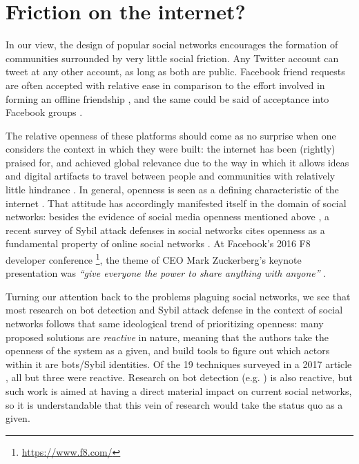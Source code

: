 \documentclass[sigconf,authordraft]{acmart}
\begin{document}
\section{Friction on the internet?}

In our view, the design of popular social networks encourages the formation of communities surrounded by very little social friction. Any Twitter account can tweet at any other account, as long as both are public. Facebook friend requests are often accepted with relative ease in comparison to the effort involved in forming an offline friendship \cite{rashtian2014befriend}, and the same could be said of acceptance into Facebook groups \cite{park2009being}. 

The relative openness of these platforms should come as no surprise when one considers the context in which they were built: the internet has been (rightly) praised for, and achieved global relevance due to the way in which it allows ideas and digital artifacts to travel between people and communities with relatively little hindrance \cite{box2016internet, box2016economic}. In general, openness is seen as a defining characteristic of the internet \cite{bechmann2014ubiquitous, lessig2002future, daigle2015nature}. That attitude has accordingly manifested itself in the domain of social networks: besides the evidence of social media openness mentioned above \cite{rashtian2014befriend, park2009being}, a recent survey of Sybil attack defenses in social networks cites openness as a fundamental property of online social networks \cite{al2017sybil}. At Facebook's 2016 F8 developer conference \footnote{\url{https://www.f8.com/}}, the theme of CEO Mark Zuckerberg's keynote presentation was {\itshape ``give everyone the power to share anything with anyone'' }\cite{USAtoday_F8_keynote_sharequote}. 

Turning our attention back to the problems plaguing social networks, we see that most research on bot detection and Sybil attack defense in the context of social networks follows that same ideological trend of prioritizing openness: many proposed solutions are {\itshape reactive} in nature, meaning that the authors take the openness of the system as a given, and build tools to figure out which actors within it are bots/Sybil identities. Of the 19 techniques surveyed in a 2017 article \cite{al2017sybil}, all but three \cite{yu2006sybilguard,yu2008sybillimit,Tran2011Gatekeeper} were reactive. Research on bot detection (e.g. \cite{davis2016botornot}) is also reactive, but such work is aimed at having a direct material impact on current social networks, so it is understandable that this vein of research would take the status quo as a given.
\end{document}
